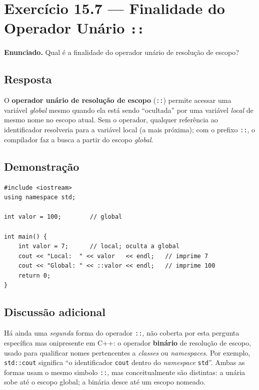 \documentclass[11pt,a4paper]{article}
\begin{document}
\section{Exerc\'icio 15.7 --- Finalidade do Operador Un\'ario \texttt{::}}

\begin{enunciado}
\textbf{Enunciado.} Qual \'e a finalidade do operador un\'ario de resolu\c{c}\~ao de escopo?
\end{enunciado}

\subsection*{Resposta}

\begin{enunciado}
O \textbf{operador un\'ario de resolu\c{c}\~ao de escopo} (\texttt{::}) permite acessar uma vari\'avel \emph{global} mesmo quando ela est\'a sendo ``ocultada'' por uma vari\'avel \emph{local} de mesmo nome no escopo atual. Sem o operador, qualquer refer\^encia ao identificador resolveria para a vari\'avel local (a mais pr\'oxima); com o prefixo \texttt{::}, o compilador faz a busca a partir do escopo \emph{global}.
\end{enunciado}

\subsection*{Demonstra\c{c}\~ao}

\begin{lstlisting}[style=cppcode]
#include <iostream>
using namespace std;

int valor = 100;        // global

int main() {
    int valor = 7;      // local; oculta a global
    cout << "Local:  " << valor   << endl;   // imprime 7
    cout << "Global: " << ::valor << endl;   // imprime 100
    return 0;
}
\end{lstlisting}

\subsection*{Discuss\~ao adicional}

H\'a ainda uma \emph{segunda} forma do operador \texttt{::}, n\~ao coberta por esta pergunta espec\'ifica mas onipresente em C++: o operador \textbf{bin\'ario} de resolu\c{c}\~ao de escopo, usado para qualificar nomes pertencentes a \emph{classes} ou \emph{\emph{namespaces}}. Por exemplo, \texttt{std::cout} significa ``o identificador \texttt{cout} dentro do \emph{namespace} \texttt{std}''. Ambas as formas usam o mesmo simbolo \texttt{::}, mas conceitualmente s\~ao distintas: a un\'aria sobe at\'e o escopo global; a bin\'aria desce at\'e um escopo nomeado.
\end{document}
